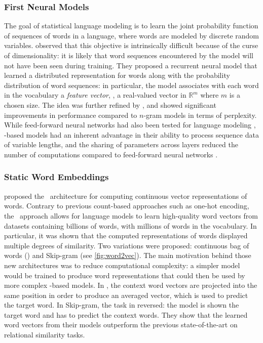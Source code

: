 \subsubsection{First Neural Models}
The goal of statistical language modeling is to learn the joint probability function of sequences of words in a language, where words are modeled by discrete random variables. \citet{bengio2000neural} observed that this objective is intrinsically difficult because of the curse of dimensionality: it is likely that word sequences encountered by the model will not have been seen during training. They proposed a recurrent neural model that learned a distributed representation for words along with the probability distribution of word sequences: in particular, the model associates with each word in the vocabulary a \emph{feature vector}, {\ie}, a real-valued vector in $\mathbb{R}^m$ where $m$ is a chosen size. The idea was further refined by \citet{mikolov2010recurrent}, and showed significant improvements in performance compared to $n$-gram models in terms of perplexity. While feed-forward neural networks had also been tested for language modeling \citep{xu2000can}, \rnn-based models had an inherent advantage in their ability to process sequence data of variable lengths, and the sharing of parameters across layers reduced the number of computations compared to feed-forward neural networks \citep{jing2019survey}.

\subsubsection{Static Word Embeddings}
\citet{mikolov2013efficient} proposed the \wvec\ architecture for computing continuous vector representations of words. Contrary to previous count-based approaches such as one-hot encoding, the \wvec\ approach allows for language models to learn high-quality word vectors from datasets containing billions of words, with millions of words in the vocabulary. In particular, it was shown that the computed representations of words displayed multiple degrees of similarity. Two variations were proposed: continuous bag of words (\cbow) and Skip-gram (see \autoref{fig:word2vec}). The main motivation behind those new architectures was to reduce computational complexity: a simpler model would be trained to produce word representations that could then be used by more complex {\rnn}-based models. In \cbow, the context word vectors are projected into the same position in order to produce an averaged vector, which is used to predict the target word. In Skip-gram, the task in reversed: the model is shown the target word and has to predict the context words. They show that the learned word vectors from their models outperform the previous state-of-the-art on relational similarity tasks. 

